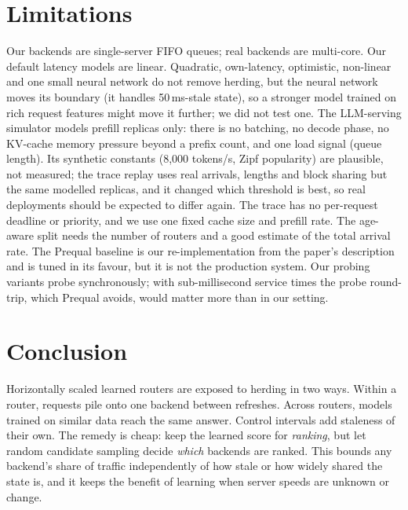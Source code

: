 \documentclass[10pt,twocolumn,letterpaper]{article}
\newif\ifrealsys\realsysfalse %
\begin{document}
\section{Limitations}
Our backends are single-server FIFO queues; real backends are multi-core.
Our default latency models are linear. Quadratic, own-latency, optimistic,
non-linear and one small neural network do not remove herding, but the neural
network moves its boundary (it handles 50\,ms-stale state), so a stronger model
trained on rich request features might move it further; we did not test one. The LLM-serving simulator models prefill
replicas only: there is no batching, no decode phase, no KV-cache memory
pressure beyond a prefix count, and one load signal (queue length). Its
synthetic constants (8{,}000 tokens/s, Zipf popularity) are plausible, not measured; the
trace replay uses real arrivals, lengths and block sharing but the same modelled replicas, and it
changed which threshold is best, so real deployments should be expected to differ again.
The trace has no per-request deadline or priority, and we use one fixed cache size
and prefill rate.
The age-aware split needs the number of routers and a good estimate of the
total arrival rate. The Prequal baseline is our re-implementation
from the paper's description and is tuned in its favour, but it is not the
production system. Our probing variants probe synchronously; with sub-millisecond
service times the probe round-trip, which Prequal avoids, would matter more
than in our setting. \ifrealsys The prototype runs on a 10$\times$ slower time scale than
the simulator, so that single-threaded Python routers keep headroom. Each
prototype run covers about a third of a simulator run in scaled time, which
emphasises transients such as learning after a gray failure.\fi

\section{Conclusion}
Horizontally scaled learned routers are exposed to herding in two ways.
Within a router, requests pile onto one backend between refreshes. Across
routers, models trained on similar data reach the same answer. Control
intervals add staleness of their own. The remedy is cheap: keep the learned
score for \emph{ranking}, but let random candidate sampling decide
\emph{which} backends are ranked. This bounds any backend's share of traffic
independently of how stale or how widely shared the state is, and it keeps
the benefit of learning when server speeds are unknown or change.
\end{document}

